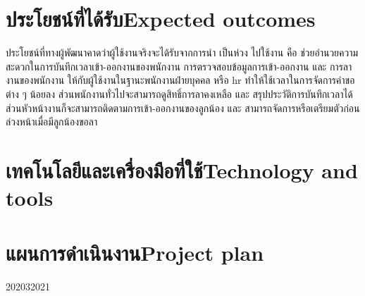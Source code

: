 \section{\ifcpe ประโยชน์ที่ได้รับ\else Expected outcomes\fi}
ประโยชน์ที่ทางผู้พัฒนาคาดว่าผู้ใช้งานจริงจะได้รับจากการนำ เป็นห่วง ไปใช้งาน คือ ช่วยอำนวยความสะดวกในการบันทึกเวลาเข้า-ออกงานของพนักงาน 
การตรวจสอบข้อมูลการเข้า-ออกงาน และ การลางานของพนักงาน ให้กับผู้ใช้งานในฐานะพนักงานฝ่ายบุคคล หรือ hr 
ทำให้ใช้เวลาในการจัดการคำขอต่าง ๆ น้อยลง ส่วนพนักงานทั่วไปจะสามารถดูสิทธิ์การลาคงเหลือ และ สรุปประวัติการบันทึกเวลาได้  
ส่วนหัวหน้างานก็จะสามารถติดตามการเข้า-ออกงานของลูกน้อง และ สามารถจัดการหรือเตรียมตัวก่อนล่วงหน้าเมื่อมีลูกน้องขอลา
\section{\ifcpe เทคโนโลยีและเครื่องมือที่ใช้\else Technology and tools\fi}
\section{\ifcpe แผนการดำเนินงาน\else Project plan\fi}
\begin{plan}{7}{2020}{3}{2021}
\end{plan}

